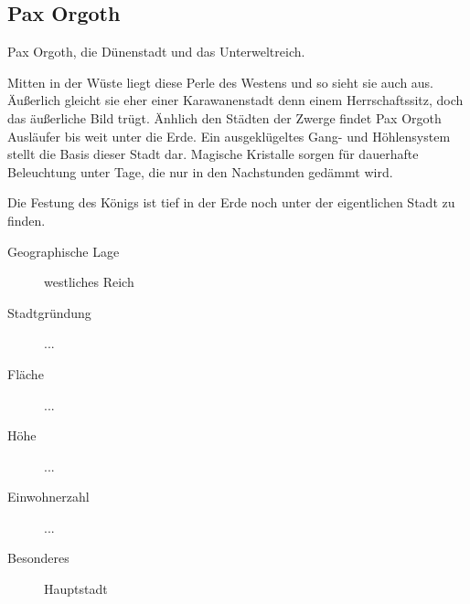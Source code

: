 \subsection{Pax Orgoth}
\par Pax Orgoth, die Dünenstadt und das Unterweltreich.
\par Mitten in der Wüste liegt diese Perle des Westens und so sieht sie auch aus. Äußerlich gleicht sie eher
einer Karawanenstadt denn einem Herrschaftssitz, doch das äußerliche Bild trügt. Änhlich den Städten der Zwerge
findet Pax Orgoth Ausläufer bis weit unter die Erde. Ein ausgeklügeltes Gang- und Höhlensystem stellt die Basis dieser
Stadt dar. Magische Kristalle sorgen für dauerhafte Beleuchtung unter Tage, die nur in den Nachstunden gedämmt wird.
\par Die Festung des Königs ist tief in der Erde noch unter der eigentlichen Stadt zu finden.

\begin{description}
\item [Geographische Lage] westliches Reich
\item [Stadtgründung] ...
\item [Fläche] ...
\item [Höhe] ...
\item [Einwohnerzahl] ...
\item [Besonderes] Hauptstadt
\end{description}